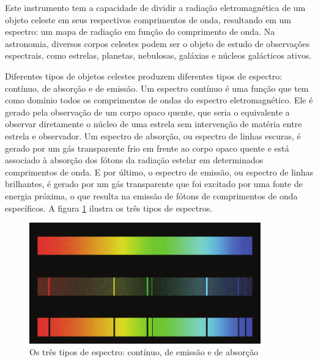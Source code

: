 Este instrumento tem a capacidade de dividir a radiação eletromagnética de um objeto celeste em seus respectivos comprimentos de onda, resultando em um espectro: um mapa de radiação em função do comprimento de onda. Na astronomia, diversos corpos celestes podem ser o objeto de estudo de observações espectrais, como estrelas, planetas, nebulosas, galáxias e núcleos galácticos ativos.  


Diferentes tipos de objetos celestes produzem diferentes tipos de espectro:  contínuo, de absorção e de emissão. Um espectro contínuo é uma função que tem como domínio todos os comprimentos de ondas do espectro eletromagnético.
Ele é gerado pela observação de um corpo opaco quente, que seria o equivalente a observar diretamente o núcleo de uma estrela sem intervenção de matéria entre estrela e observador. Um espectro de absorção, ou espectro de linhas escuras, é gerado por um gás transparente frio em frente ao corpo opaco quente e está associado à absorção dos fótons da radiação estelar em determinados comprimentos de onda. E por último, o espectro de emissão, ou espectro de linhas brilhantes, é gerado por um gás transparente que foi excitado por uma fonte de energia próxima, o que resulta na emissão de fótons de comprimentos de onda específicos. A figura \ref{fig:spectrum-types} ilustra os três tipos de espectros. 

\begin{figure}[htb]
\centering
\includegraphics[width=10cm]{figuras/Continuous-spectrum-and-two-types-of-line-spectra.png}
\caption{Os três tipos de espectro: contínuo, de emissão e de absorção \citep{mcgrawhill}}
\label{fig:spectrum-types}
\end{figure}

